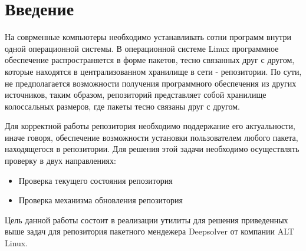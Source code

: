 \section*{Введение}
На соврменные компьютеры необходимо устанавливать сотни программ внутри
одной операционной системы. В операционной системе Linux программное 
обеспечение распространяется в форме пакетов, тесно связанных друг с другом,
которые находятся в централизованном хранилище в сети - репозитории. По
сути, не предполагается возможности получения программного обеспечения из 
других источников, таким образом, репозиторий представляет собой хранилище 
колоссальных размеров, где пакеты тесно связаны друг с другом.

Для корректной работы репозитория необходимо поддержание его актуальности, 
иначе говоря, обеспечение возможности установки пользователем любого пакета,
находящегося в репозитории. Для решения этой задачи необходимо осуществлять
проверку в двух направлениях: 
\begin{itemize}
\item{Проверка текущего состояния репозитория}
\item{Проверка механизма обновления репозитория}
\end{itemize}

Цель данной работы состоит в реализации утилиты для решения приведенных
выше задач для репозитория пакетного мендежера Deepsolver от компании
ALT Linux.









